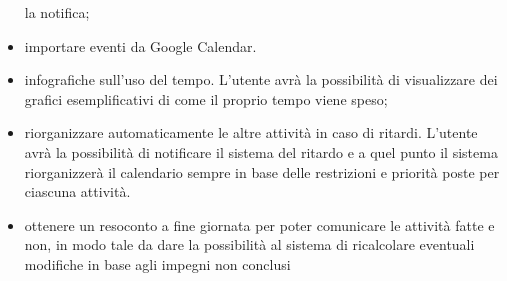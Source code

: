 \begin{itemize}
    la notifica;
    \item importare eventi da Google Calendar.
    \item infografiche sull'uso del tempo. L'utente avrà la possibilità di visualizzare dei grafici esemplificativi di come il proprio
    tempo viene speso;
    \item riorganizzare automaticamente le altre attività in caso di ritardi. L'utente avrà la possibilità di notificare il sistema del ritardo e 
    a quel punto il sistema riorganizzerà il calendario sempre in base delle restrizioni e priorità poste per ciascuna attività.
    \item ottenere un resoconto a fine giornata per poter comunicare le attività fatte e non, in modo tale da dare la possibilità al sistema di ricalcolare eventuali modifiche in base agli impegni non conclusi
\end{itemize}

